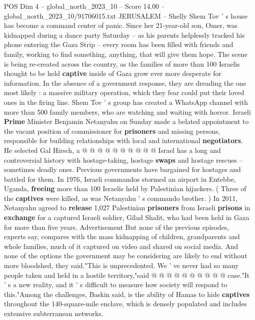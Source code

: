 \begin{textsample}{POS Dim 4 – global\_north\_2023\_10 – Score 14.00 – global\_north\_2023\_10/91706015.txt}  \label{ex:f4_pos_443}
JERUSALEM -- Shelly Shem Tov ' s house has become a command center of panic.
Since her 21-year-old son, Omer, was kidnapped during a dance party Saturday -- as his parents helplessly tracked his phone entering the Gaza Strip -- every room has been filled with friends and family, working to find something, anything, that will give them hope.
The scene is being re-created across the country, as the families of more than 100 Israelis thought to be held \textbf{captive} inside of Gaza grow ever more desperate for information.
In the absence of a government response, they are dreading the one most likely : a massive military operation, which they fear could put their loved ones in the firing line.
Shem Tov ' s group has created a WhatsApp channel with more than 500 family members, who are watching and waiting with horror.
Israeli \textbf{Prime} Minister Benjamin Netanyahu on Sunday made a belated appointment to the vacant position of commissioner for \textbf{prisoners} and missing persons, responsible for building relationships with local and international \textbf{negotiators}.
He selected Gal Hirsch, a @ @ @ @ @ @ @ @ @ @ Israel has a long and controversial history with hostage-taking, hostage \textbf{swaps} and hostage rescues -- sometimes deadly ones.
Previous governments have bargained for hostages and battled for them.
In 1976, Israeli commandos stormed an airport in Entebbe, Uganda, \textbf{freeing} more than 100 Israelis held by Palestinian hijackers. ( Three of the \textbf{captives} were killed, as was Netanyahu ' s commando brother. ) In 2011, Netanyahu agreed to \textbf{release} 1,027 Palestinian \textbf{prisoners} from Israeli \textbf{prisons} in \textbf{exchange} for a captured Israeli soldier, Gilad Shalit, who had been held in Gaza for more than five years.
Advertisement But none of the previous episodes, experts say, compares with the mass kidnapping of children, grandparents and whole families, much of it captured on video and shared on social media.
And none of the options the government may be considering are likely to end without more bloodshed, they said."This is unprecedented.
We ' ve never had so many people taken and held in a hostile territory,"said @ @ @ @ @ @ @ @ @ @ case."It ' s a new reality, and it ' s difficult to measure how society will respond to this."Among the challenges, Baskin said, is the ability of Hamas to hide \textbf{captives} throughout the 140-square-mile enclave, which is densely populated and includes extensive subterranean networks.

\end{textsample}
